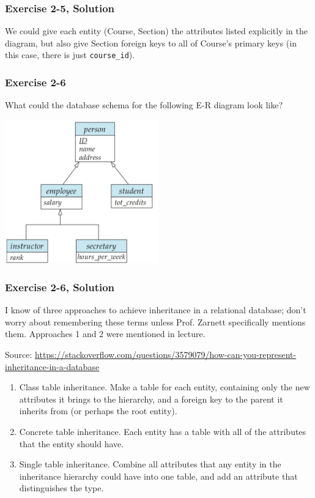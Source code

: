 \begin{frame}
\frametitle{Exercise 2-5, Solution}

We could give each entity (Course, Section) the attributes listed explicitly in the diagram, but also give Section foreign keys to all of Course's primary keys (in this case, there is just \texttt{course\_id}).

\end{frame}


\begin{frame}
\frametitle{Exercise 2-6}

What could the database schema for the following E-R diagram look like?

\begin{center}
  \includegraphics[width=0.5\textwidth]{images/specialization-generalization}
\end{center}

\end{frame}


\begin{frame}
\frametitle{Exercise 2-6, Solution}

I know of three approaches to achieve inheritance in a relational database; don't worry about remembering these terms unless Prof. Zarnett specifically mentions them. Approaches 1 and 2 were mentioned in lecture.

Source: \href{https://stackoverflow.com/questions/3579079/how-can-you-represent-inheritance-in-a-database}{https://stackoverflow.com/questions/3579079/how-can-you-represent-inheritance-in-a-database}

\begin{enumerate}
  \item Class table inheritance. Make a table for each entity, containing only the new attributes it brings to the hierarchy, and a foreign key to the parent it inherits from (or perhaps the root entity).

  \item Concrete table inheritance. Each entity has a table with all of the attributes that the entity should have.

  \item Single table inheritance. Combine all attributes that any entity in the inheritance hierarchy could have into one table, and add an attribute that distinguishes the type.
\end{enumerate}
\end{frame}



